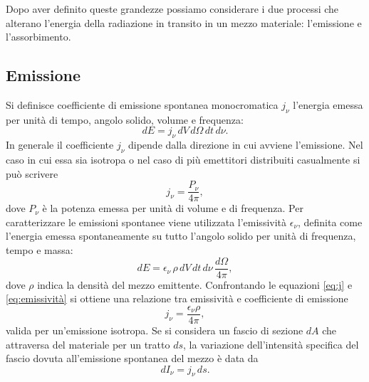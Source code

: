 Dopo aver definito queste grandezze possiamo considerare i due processi che alterano l'energia della radiazione in transito in un mezzo materiale: l'emissione e l'assorbimento.

\subsection{Emissione}

Si definisce coefficiente di emissione spontanea monocromatica $j_{\nu}$ l'energia emessa per unità di tempo, angolo solido, volume e frequenza:
\begin{equation}
dE=j_{\nu}\,dV\,d\Omega\,dt\,d\nu.
\label{eq:j}
\end{equation}
In generale il coefficiente $j_\nu$ dipende dalla direzione in cui avviene l'emissione. Nel caso in cui essa sia isotropa o nel caso di più emettitori distribuiti casualmente si può scrivere 
\begin{equation}
j_{\nu}=\frac{P_{\nu}}{4\pi},
\label{eq:jisotropico}
\end{equation}
dove $P_{\nu}$ è la potenza emessa per unità di volume e di frequenza. Per caratterizzare le emissioni spontanee viene utilizzata l'emissività $\epsilon_{\nu}$, definita come l'energia emessa spontaneamente su tutto l'angolo solido per unità di frequenza, tempo e massa:
\begin{equation}
dE=\epsilon_{\nu}\,\rho\,dV\,dt\,d\nu\,\frac{d\Omega}{4\pi},
\label{eq:emissività}
\end{equation}
dove $\rho$ indica la densità del mezzo emittente. Confrontando le equazioni \ref{eq:j} e \ref{eq:emissività} si ottiene una relazione tra emissività e coefficiente di emissione
\begin{equation}
j_{\nu}=\frac{\epsilon_{\nu}\rho}{4\pi},
\label{jepsilon}
\end{equation}
valida per un'emissione isotropa. Se si considera un fascio di sezione $dA$ che attraversa del materiale per un tratto $ds$, la variazione dell'intensità specifica del fascio dovuta all'emissione spontanea del mezzo è data da
\begin{equation}
dI_{\nu}=j_{\nu}\,ds.
\label{dIj}
\end{equation}

